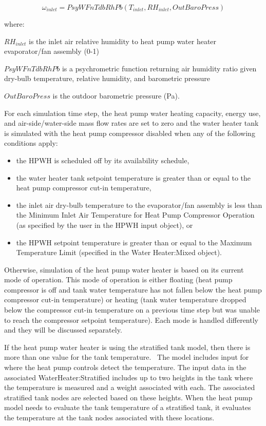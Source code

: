 \begin{equation}
{\omega_{inlet}} = PsyWFnTdbRhPb({T_{inlet}},R{H_{inlet}},OutBaroPress)
\end{equation}

where:

\(R{H_{inlet}}\) is the inlet air relative humidity to heat pump water heater evaporator/fan assembly (0-1)

\(PsyWFnTdbRhPb\) is a psychrometric function returning air humidity ratio given dry-bulb temperature, relative humidity, and barometric pressure

\(OutBaroPress\) is the outdoor barometric pressure (Pa).

For each simulation time step, the heat pump water heating capacity, energy use, and air-side/water-side mass flow rates are set to zero and the water heater tank is simulated with the heat pump compressor disabled when any of the following conditions apply:

\begin{itemize}
\item the HPWH is scheduled off by its availability schedule,
\item the water heater tank setpoint temperature is greater than or equal to the heat pump compressor cut-in temperature,
\item the inlet air dry-bulb temperature to the evaporator/fan assembly is less than the Minimum Inlet Air Temperature for Heat Pump Compressor Operation (as specified by the user in the HPWH input object), or
\item the HPWH setpoint temperature is greater than or equal to the Maximum Temperature Limit (specified in the Water Heater:Mixed object).
\end{itemize}

Otherwise, simulation of the heat pump water heater is based on its current mode of operation. This mode of operation is either floating (heat pump compressor is off and tank water temperature has not fallen below the heat pump compressor cut-in temperature) or heating (tank water temperature dropped below the compressor cut-in temperature on a previous time step but was unable to reach the compressor setpoint temperature). Each mode is handled differently and they will be discussed separately.

If the heat pump water heater is using the stratified tank model, then there is more than one value for the tank temperature.~ The model includes input for where the heat pump controls detect the temperature. The input data in the associated WaterHeater:Stratified includes up to two heights in the tank where the temperature is measured and a weight associated with each. The associated stratified tank nodes are selected based on these heights. When the heat pump model needs to evaluate the tank temperature of a stratified tank, it evaluates the temperature at the tank nodes associated with these locations.


